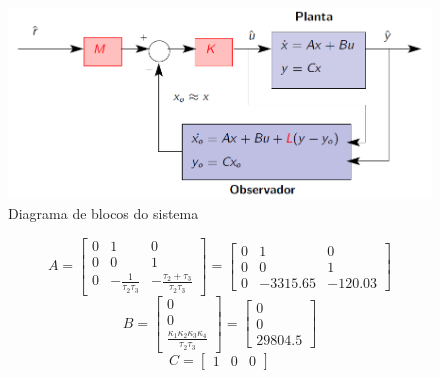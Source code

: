 \documentclass{article}
\begin{document}
\begin{figure}[H]
	\centering
	\includegraphics[width=0.8\linewidth]{contrss}
	\caption{Diagrama de blocos do sistema}
	\label{fig:contrss}
\end{figure}

\begin{equation}
\label{eq:mata}
A=
\begin{bmatrix}
 0 & 1 & 0 \\
 0 & 0 & 1 \\
 0 & -\frac{1}{\tau_2\tau_3} & -\frac{\tau_2+\tau_3}{\tau_2\tau_3}
\end{bmatrix} = 
\begin{bmatrix}
0 & 1 & 0 \\
0 & 0 & 1 \\
0 & -3315.65 & -120.03
\end{bmatrix}
\end{equation}
\begin{equation}
\label{eq:matb}
B=
\begin{bmatrix}
0 \\
0 \\
\frac{\kappa_1\kappa_2\kappa_3\kappa_4}{\tau_2\tau_3}
\end{bmatrix} = 
\begin{bmatrix}
0 \\
0 \\
29804.5
\end{bmatrix}
\end{equation}
\begin{equation}
\label{eq:matc}
C=
\begin{bmatrix}
1 & 0 & 0
\end{bmatrix}
\end{equation}
\end{document}
